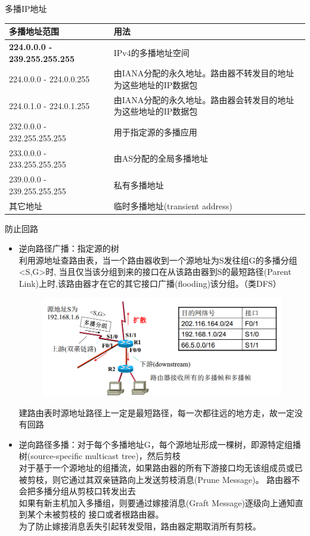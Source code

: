 多播IP地址
\begin{center}
\begin{tabular}{|l|p{10em}|}\hline
多播地址范围 & 用法\\\hline
\textbf{224.0.0.0 - 239.255.255.255} & IPv4的多播地址空间\\\hline
224.0.0.0 - 224.0.0.255 & 由IANA分配的永久地址。路由器不转发目的地址为这些地址的IP数据包\\\hline
224.0.1.0 - 224.0.1.255 & 由IANA分配的永久地址。路由器会转发目的地址为这些地址的IP数据包\\\hline
232.0.0.0 - 232.255.255.255 & 用于指定源的多播应用\\\hline
233.0.0.0 - 233.255.255.255 & 由AS分配的全局多播地址\\\hline
239.0.0.0 - 239.255.255.255 & 私有多播地址\\\hline
其它地址 & 临时多播地址(transient address)\\\hline
\end{tabular}
\end{center}

防止回路
\begin{itemize}
\item 逆向路径广播：指定源的树\\
利用源地址查路由表，当一个路由器收到一个源地址为S发往组G的多播分组<S,G>时, 当且仅当该分组到来的接口在从该路由器到S的最短路径(Parent Link)上时,该路由器才在它的其它接口广播(flooding)该分组。（类DFS）
\begin{figure}[H]
	\centering
	\includegraphics[width=0.8\linewidth]{fig/reverse_path_broadcasting.png}
\end{figure}
建路由表时源地址路径上一定是最短路径，每一次都往远的地方走，故一定没有回路
\item 逆向路径多播：对于每个多播地址G，每个源地址形成一棵树，即源特定组播树(source-specific multicast tree)，然后剪枝\\
对于基于一个源地址的组播流，如果路由器的所有下游接口均无该组成员或已被剪枝，则它通过其双亲链路向上发送剪枝消息(Prune Message)。 路由器不会把多播分组从剪枝口转发出去\\
如果有新主机加入多播组，则要通过嫁接消息(Graft Message)逐级向上通知直到某个未被剪枝的
接口或者根路由器。\\
为了防止嫁接消息丢失引起转发受阻，路由器定期取消所有剪枝。
\end{itemize}

